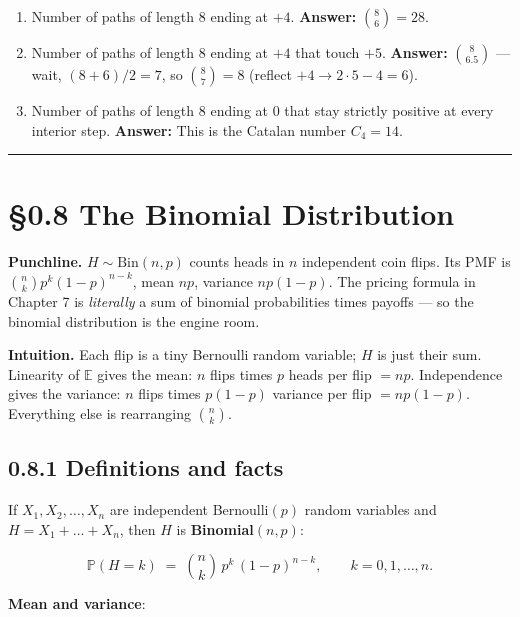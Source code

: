 \documentclass[
  10pt,
  twoside]{book}
\providecommand{\tightlist}{%
  \setlength{\itemsep}{0pt}\setlength{\parskip}{0pt}}
\begin{document}
\begin{enumerate}
\def\labelenumi{\arabic{enumi}.}
\tightlist
\item
  Number of paths of length 8 ending at \(+4\). \textbf{Answer:}
  \(\binom{8}{6} = 28\).
\item
  Number of paths of length 8 ending at \(+4\) that touch \(+5\).
  \textbf{Answer:} \(\binom{8}{6.5}\) --- wait, \((8 + 6)/2 = 7\), so
  \(\binom{8}{7} = 8\) (reflect \(+4 \to 2 \cdot 5 - 4 = 6\)).
\item
  Number of paths of length 8 ending at \(0\) that stay strictly
  positive at every interior step. \textbf{Answer:} This is the Catalan
  number \(C_4 = 14\).
\end{enumerate}

\begin{center}\rule{0.5\linewidth}{0.5pt}\end{center}

\section{§0.8 The Binomial
Distribution}\label{the-binomial-distribution}

\textbf{Punchline.} \(H \sim \mathrm{Bin}(n, p)\) counts heads in \(n\)
independent coin flips. Its PMF is \(\binom{n}{k} p^k (1-p)^{n-k}\),
mean \(np\), variance \(np(1-p)\). The pricing formula in Chapter 7 is
\emph{literally} a sum of binomial probabilities times payoffs --- so
the binomial distribution is the engine room.

\textbf{Intuition.} Each flip is a tiny Bernoulli random variable; \(H\)
is just their sum. Linearity of \(\mathbb{E}\) gives the mean: \(n\)
flips times \(p\) heads per flip \(= np\). Independence gives the
variance: \(n\) flips times \(p(1-p)\) variance per flip \(= np(1-p)\).
Everything else is rearranging \(\binom{n}{k}\).

\subsection{0.8.1 Definitions and facts}\label{definitions-and-facts}

If \(X_1, X_2, \dots, X_n\) are independent Bernoulli\((p)\) random
variables and \(H = X_1 + \dots + X_n\), then \(H\) is
\textbf{Binomial\((n, p)\)}:

\[\mathbb{P}(H = k) \;=\; \binom{n}{k}\, p^k\, (1-p)^{n-k}, \qquad k = 0, 1, \dots, n.\]

\textbf{Mean and variance}:
\end{document}
